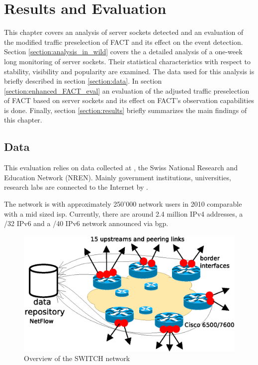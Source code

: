 \chapter{Results and Evaluation \label{chapter:results}}

This chapter covers an analysis of server sockets detected and an evaluation of the modified traffic preselection of \gls{FACT} and its effect on the event detection. 
Section \ref{section:analysis_in_wild} covers the a detailed analysis of a one-week long monitoring of server sockets. Their statistical characteristics with respect to stability, visibility and popularity are examined. 
The data used for this analysis is briefly described in section \ref{section:data}.
In section \ref{section:enhanced_FACT_eval} an evaluation of the adjusted traffic preselection of \gls{FACT} based on server sockets and its effect on \gls{FACT}'s observation capabilities is done.
Finally, section \ref{section:results} briefly summarizes the main findings of this chapter. 

\section{Data 
\label{section:data}}

This evaluation relies on data collected at \citet{switch}, the Swiss National Research and Education Network (NREN). 
Mainly government institutions, universities, research labs are connected to the Internet by \citet{switch}\citep{Schatzmann:Mining}.

The \citet{switch} network is with approximately 250'000 network users in 2010 comparable with a mid sized \gls{isp}. Currently, there are around 2.4 million \gls{IPv4} addresses, a /32 IPv6 and a /40 \gls{IPv6} network announced via \gls{bgp}\citep{Schatzmann:Tracing}.
\begin{figure}
	[ht] \centering 
	\includegraphics[width=12cm]{images/network_overview.eps} \caption{Overview of the SWITCH network \citep{SchatzmanThesis2012}} 
	\label{fig:switch_nework} 
\end{figure}

